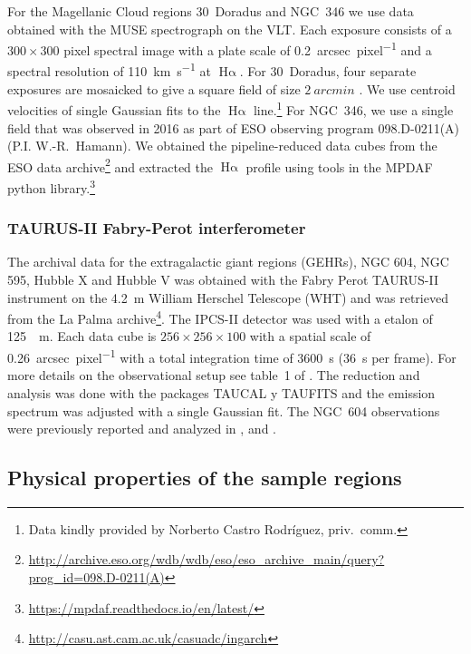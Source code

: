 \documentclass[fleqn,usenatbib, useAMS, a4paper]{mnras}
\newcommand\ha{\ensuremath{\text{H}\upalpha}}
\begin{document}
For the Magellanic Cloud regions 30~Doradus and NGC~346 we use data obtained
with the MUSE spectrograph \citep{Bacon:2010a, Bacon:2014a} on the VLT.\@
Each exposure consists of a \(300 \times 300\) pixel spectral image with a plate scale
of \SI{0.2}{arcsec.pixel^{-1}} and a spectral resolution of \SI{110}{km.s^{-1}}
at \ha{}.
For 30~Doradus, four separate exposures are mosaicked to give a square field of
size \(\SI{2}{arcmin}\) \citep{Castro:2018a}. 
We use centroid velocities of single Gaussian fits to the \ha{} line.\footnote{%
  Data kindly provided by Norberto Castro Rodríguez, priv.~comm.
}
For NGC~346, we use a single field that was observed in 2016 as part of
ESO observing program 098.D-0211(A) (P.I. W.-R.~Hamann).
We obtained the pipeline-reduced data cubes from the ESO data archive\footnote{%
  \url{http://archive.eso.org/wdb/wdb/eso/eso_archive_main/query?prog_id=098.D-0211(A)}
}
and extracted the \ha{} profile using tools in the MPDAF python library.\footnote{
  \url{https://mpdaf.readthedocs.io/en/latest/}
} 

\subsubsection{TAURUS-II Fabry-Perot interferometer}
\label{sec:taurus-ii-fabry}

The archival data for the extragalactic giant regions (GEHRs), NGC 604, NGC 595, Hubble X and Hubble V was obtained with the Fabry Perot TAURUS-II instrument
\citep{Gordon:2000v}
on the \SI{4.2}{m} William Herschel Telescope (WHT) and was retrieved from the La Palma archive\footnote{\url{http://casu.ast.cam.ac.uk/casuadc/ingarch}}.
The IPCS-II detector was used with a etalon of \SI{125}{\mu m}.
Each data cube is \(256 \times 256 \times 100\) with a spatial scale of \SI{0.26}{arcsec.pixel^{-1}} with a total integration time of \SI{3600}{s} (\SI{36}{s} per frame).
For more details on the observational setup see table~1 of \citet{sabalisck1995supersonic}.
The reduction and analysis was done with the packages TAUCAL y TAUFITS \citep{1992ASPC...25..445L} and the emission spectrum was adjusted with a single Gaussian fit.
The NGC~604 observations were previously reported and analyzed in
\citet{sabalisck1995supersonic}, \citet{Medina-Tanco:1997a} and \citet{Melnick:2021x}.


\subsection{Physical properties of the sample regions}
\label{sec:regions-milky-way}
\end{document}
